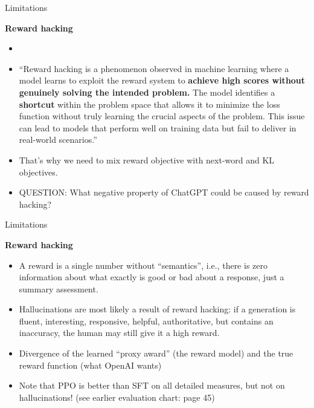 \begin{vbframe}{Limitations}

\vfill

\textbf{Reward hacking}

	\begin{itemize}
		\item \href{https://medium.com/@prdeepak.babu/reward-hacking-in-large-language-models-llms-c57abbc0cde7}{}
		\item
``Reward hacking is a phenomenon observed in machine
		learning where a model learns to exploit the
		reward system to \textbf{achieve high scores without
		genuinely solving the intended problem.} The
		model identifies a \textbf{shortcut} within the
		problem space that allows it to minimize the
		loss function without truly learning the
		crucial aspects of the problem. This issue
		can lead to models that perform well on
		training data but fail to deliver in
		real-world scenarios.''
                \item That's why we need to mix reward
		objective with next-word and KL objectives.
\item QUESTION: What negative property of ChatGPT
		could be caused by reward hacking?

	\end{itemize}

\vfill

\end{vbframe}

\begin{vbframe}{Limitations}

\vfill

\textbf{Reward hacking}

	\begin{itemize}
		\item
                A reward is a single number without
		``semantics'', i.e., there is zero
		information about what exactly is good or
		bad about a response, just a summary
		assessment.
                
\item Hallucinations are most likely a result of reward
		hacking: if a generation is fluent,
	interesting, responsive, helpful, authoritative, but
	contains an inaccuracy, the human may still give it a
	high reward.
        \item Divergence of the learned ``proxy award'' (the
	reward model) and the true reward function (what
	OpenAI wants)
        \item Note that PPO is better than SFT on all
	detailed measures, but not on hallucinations! (see
	earlier evaluation chart: page 45)
	\end{itemize}

\vfill

\end{vbframe}



